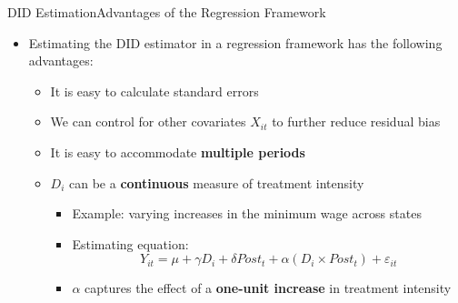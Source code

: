 \documentclass[dvipsnames,hyperref={pdfpagelabels=false}]{beamer}
\begin{document}
\begin{frame}{DID Estimation}{Advantages of the Regression Framework}
\begin{itemize}
    \item Estimating the DID estimator in a regression framework has the following advantages: 
    \vspace{0.2cm}
    \begin{itemize}
        \item It is easy to calculate standard errors
        \vspace{0.2cm}
        \item We can control for other covariates $X_{it}$ to further reduce residual bias
        \vspace{0.2cm}
        \item It is easy to accommodate \textbf{multiple periods}
        \vspace{0.2cm}
        \item $D_i$ can be a \textbf{continuous} measure of treatment intensity
        \vspace{0.2cm}
        \begin{itemize}	
            \item Example: varying increases in the minimum wage across states
            \vspace{0.2cm}
            \item Estimating equation:
            \[
                Y_{it} = \mu + \gamma D_{i} + \delta Post_t + \alpha (D_{i} \times Post_t) + \varepsilon_{it}
            \]
            \item $\alpha$ captures the effect of a \textbf{one-unit increase} in treatment intensity
        \end{itemize}
    \end{itemize}
\end{itemize}
\end{frame}
\end{document}
